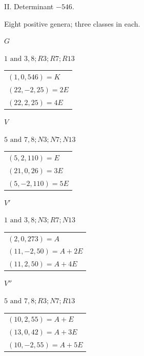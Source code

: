 \begin{center}II. Determinant \(-546\).\par\smallskip Eight positive genera; three classes in each.\end{center}
\begin{center}
\begin{minipage}[t]{0.47\linewidth}\centering
\(G\)\par\smallskip
{\small \(1\text{ and }3, 8; R3; R7; R13\)}\par\smallskip
\begin{tabular}{@{}l@{}}
\((1,0,546)=K\)\\\((22,-2,25)=2E\)\\\((22,2,25)=4E\)
\end{tabular}
\end{minipage}\hfill\begin{minipage}[t]{0.47\linewidth}\centering
\(V\)\par\smallskip
{\small \(5\text{ and }7, 8; N3; N7; N13\)}\par\smallskip
\begin{tabular}{@{}l@{}}
\((5,2,110)=E\)\\\((21,0,26)=3E\)\\\((5,-2,110)=5E\)
\end{tabular}
\end{minipage}
\end{center}
\begin{center}
\begin{minipage}[t]{0.47\linewidth}\centering
\(V'\)\par\smallskip
{\small \(1\text{ and }3, 8; N3; R7; N13\)}\par\smallskip
\begin{tabular}{@{}l@{}}
\((2,0,273)=A\)\\\((11,-2,50)=A+2E\)\\\((11,2,50)=A+4E\)
\end{tabular}
\end{minipage}\hfill\begin{minipage}[t]{0.47\linewidth}\centering
\(V''\)\par\smallskip
{\small \(5\text{ and }7, 8; R3; N7; R13\)}\par\smallskip
\begin{tabular}{@{}l@{}}
\((10,2,55)=A+E\)\\\((13,0,42)=A+3E\)\\\((10,-2,55)=A+5E\)
\end{tabular}
\end{minipage}
\end{center}

